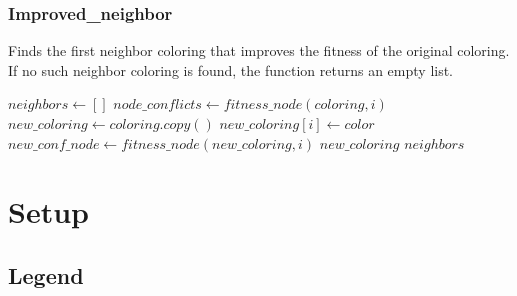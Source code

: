 \documentclass[10pt]{article}
\begin{document}
\subsubsection{Improved\_neighbor}
Finds the first neighbor coloring that improves the fitness of the original coloring. If no such neighbor coloring is found, the function returns an empty list.
\begin{algorithm}[H]
\begin{algorithmic}
\State $neighbors \gets []$
\State $node\_conflicts \gets fitness\_node(coloring,i)$
\State $new\_coloring \gets coloring.copy()$
\State $new\_coloring[i] \gets color$
\State $new\_conf\_node \gets fitness\_node(new\_coloring,i)$
\State \Return $new\_coloring$
\EndIf
\EndIf
\EndFor
\EndIf
\EndFor
\State \Return $neighbors$
\EndProcedure
\end{algorithmic}
\end{algorithm}
\section{Setup}
\subsection{Legend}
\end{document}
